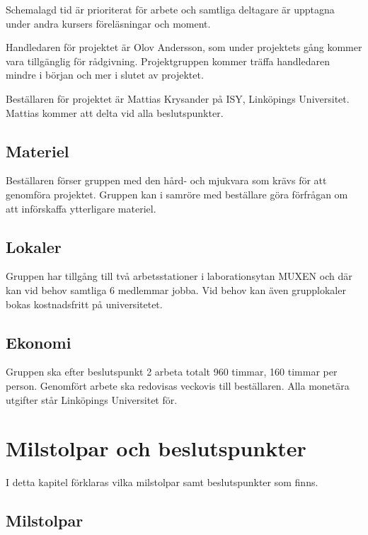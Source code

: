 \documentclass[a4paper,11pt]{article}
\begin{document}
Schemalagd tid är prioriterat för arbete och samtliga deltagare är upptagna under andra kursers föreläsningar och moment.

Handledaren för projektet är Olov Andersson, som under projektets gång kommer vara tillgänglig för rådgivning. Projektgruppen kommer träffa handledaren mindre i början och mer i slutet av projektet.

Beställaren för projektet är  Mattias Krysander på ISY, Linköpings Universitet. Mattias kommer att delta vid alla beslutspunkter.

\subsection{Materiel}
Beställaren förser gruppen med den hård- och mjukvara som krävs för att genomföra projektet. Gruppen kan i samröre med beställare göra förfrågan om att införskaffa ytterligare materiel. 

\subsection{Lokaler}
Gruppen har tillgång till två arbetsstationer i laborationsytan MUXEN och där kan vid behov samtliga 6 medlemmar jobba. Vid behov kan även grupplokaler bokas kostnadsfritt på universitetet.

\subsection{Ekonomi}
Gruppen ska efter beslutspunkt 2 arbeta totalt 960 timmar, 160 timmar per person. Genomfört arbete ska redovisas veckovis till beställaren. Alla monetära utgifter står Linköpings Universitet för.

\section{Milstolpar och beslutspunkter}
I detta kapitel förklaras vilka milstolpar samt beslutspunkter som finns.

\subsection{Milstolpar}
\begin{flushleft}
    \begin{LIPSmilstolpar}
    \end{LIPSmilstolpar}
\end{flushleft}
\end{document}
